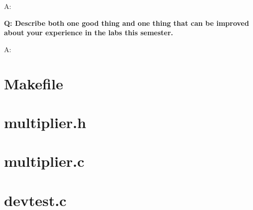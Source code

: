 \documentclass[11pt,letterpaper,titlepage]{article}
\begin{document}
A:

\textbf{Q: Describe both one good thing and one thing that can be improved about your experience
in the labs this semester.}

A: 

\newpage

\begin{appendices}

\section{Makefile}
\label{appendix:makefile}


\section{multiplier.h}
\label{appendix:sourcecode_multiplier_header}


\section{multiplier.c}
\label{appendix:sourcecode_multiplier}


\section{devtest.c}
\label{appendix:sourcecode_devtest}


\end{appendices}
\end{document}
